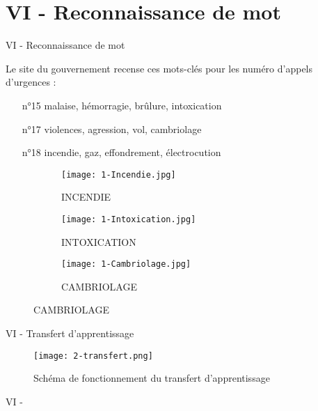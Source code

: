
\section{VI - Reconnaissance de mot}
\begin{frame}{VI - Reconnaissance de mot}
	\begin{block}{}
		Le site du gouvernement recense ces mots-clés pour les numéro d'appels d'urgences : \\
		\begin{enumerate}
		  \item[n°15] malaise, hémorragie, brûlure, intoxication
		  \item[n°17] violences, agression, vol, cambriolage
		  \item[n°18] incendie, gaz, effondrement, électrocution
		\end{enumerate}
	\end{block}
\begin{figure}
	\begin{subfigure}[]{0.3\textwidth}
		\texttt{[image: 1-Incendie.jpg]}
  		\caption{INCENDIE}
	\end{subfigure}
	\begin{subfigure}[]{0.3\textwidth}
		\texttt{[image: 1-Intoxication.jpg]}
  		\caption{INTOXICATION}
	\end{subfigure}
	\begin{subfigure}[]{0.3\textwidth}
		\texttt{[image: 1-Cambriolage.jpg]}
		\caption{CAMBRIOLAGE}
	\end{subfigure}
\end{figure}
\end{frame}


\begin{frame}{VI - Transfert d'apprentissage}
	\begin{figure}
		\texttt{[image: 2-transfert.png]}
		\caption{Schéma de fonctionnement du transfert d'apprentissage}
	\end{figure}
\end{frame}


\begin{frame}{VI - }

	

\end{frame}